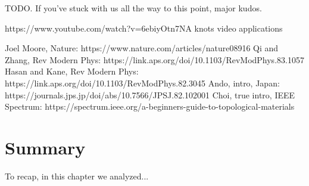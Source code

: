 \documentclass[12pt, english]{book}
\begin{document}
TODO. 
If you've stuck with us all the way to this point, major kudos.

https://www.youtube.com/watch?v=6ebiyOtn7NA knots video applications

Joel Moore, Nature: https://www.nature.com/articles/nature08916
Qi and Zhang, Rev Modern Phys: https://link.aps.org/doi/10.1103/RevModPhys.83.1057
Hasan and Kane, Rev Modern Phys: https://link.aps.org/doi/10.1103/RevModPhys.82.3045
Ando, intro, Japan: https://journals.jps.jp/doi/abs/10.7566/JPSJ.82.102001
Choi, true intro, IEEE Spectrum: https://spectrum.ieee.org/a-beginners-guide-to-topological-materials



\section{Summary}
To recap, in this chapter we analyzed...

\end{document}

